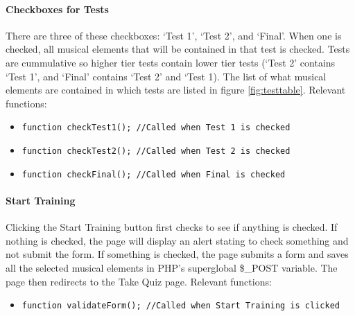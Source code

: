 \documentclass{article}
\begin{document}
\paragraph{Checkboxes for Tests}
There are three of these checkboxes: `Test 1', `Test 2', and `Final'. When one is checked, all musical elements that will be contained in that test is checked. Tests are cummulative so higher tier tests contain lower tier tests (`Test 2' contains `Test 1', and `Final' contains `Test 2' and `Test 1). The list of what musical elements are contained in which tests are listed in figure \ref{fig:testtable}.
\vskip 3mm
\noindent Relevant functions:
\begin{itemize}
\item \texttt{function checkTest1(); //Called when Test 1 is checked}
\item \texttt{function checkTest2(); //Called when Test 2 is checked}
\item \texttt{function checkFinal(); //Called when Final is checked}
\end{itemize}

\paragraph{Start Training}
Clicking the Start Training button first checks to see if anything is checked. If nothing is checked, the page will display an alert stating to check something and not submit the form. If something is checked, the page submits a form and saves all the selected musical elements in PHP's superglobal \$\_POST variable. The page then redirects to the Take Quiz page.
\vskip 3mm
\noindent Relevant functions:
\begin{itemize}
\item \texttt{function validateForm(); //Called when Start Training is clicked}
\end{itemize}
\end{document}
